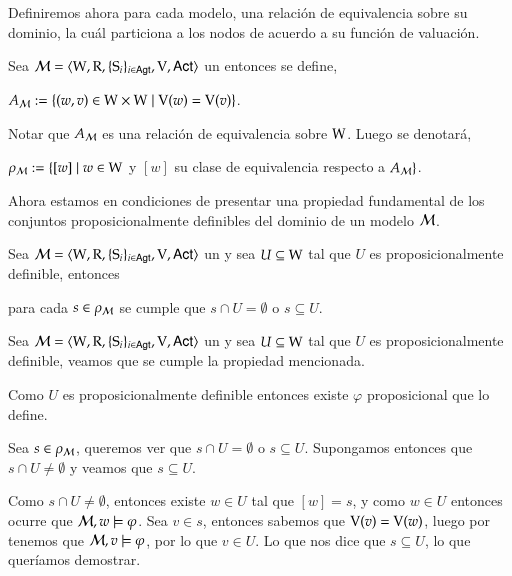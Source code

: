 Definiremos ahora para cada modelo, una relación de equivalencia sobre su dominio, la cuál particiona a los nodos de acuerdo
a su función de valuación.

\begin{definicion}\label{def:Am}
    Sea $\mathcal{M}=\langle \mathrm{W},\mathrm{R},\{ \mathrm{S}_i \}_{i \in {\rm \sf Agt}},\mathrm{V},{\rm \sf Act} \rangle$ un \ults entonces se define, 
    \begin{center}
        $A_{\mathcal{M}} := \{(w,v) \in \mathrm{W} \times \mathrm{W} \mid \mathrm{V}(w) = \mathrm{V}(v)\}$.
    \end{center}
    Notar que $A_{\mathcal{M}}$ es una relación de equivalencia sobre $\mathrm{W}$. Luego se denotará,
    \begin{center}
        $\rho_{\mathcal{M}} := \{ [w] \mid w \in \mathrm{W} $ y $[w]$ su clase de equivalencia respecto a $A_{\mathcal{M}}\}$.
    \end{center}
\end{definicion}

Ahora estamos en condiciones de presentar una propiedad fundamental de los conjuntos proposicionalmente definibles del dominio de un modelo $\mathcal{M}$.

\begin{lema}\label{lema:propositionally-definable-lemma}
    Sea $\mathcal{M}=\langle \mathrm{W},\mathrm{R},\{ \mathrm{S}_i \}_{i \in {\rm \sf Agt}},\mathrm{V},{\rm \sf Act} \rangle$ un \ults y sea $U \subseteq \mathrm{W}$ tal que $U$ es proposicionalmente definible, entonces
    \begin{center}
        para cada $s \in \rho_{\mathcal{M}}$ se cumple que $s \cap U = \emptyset$ o $s \subseteq U$.
    \end{center}
\end{lema}

\begin{demostracion}
    Sea $\mathcal{M}=\langle \mathrm{W},\mathrm{R},\{ \mathrm{S}_i \}_{i \in {\rm \sf Agt}},\mathrm{V},{\rm \sf Act} \rangle$ un \ults y sea $U \subseteq \mathrm{W}$ tal que $U$ es proposicionalmente definible, 
    veamos que se cumple la propiedad mencionada.

    Como $U$ es proposicionalmente definible entonces existe $\varphi$ proposicional que lo define.

    Sea $s \in \rho_{\mathcal{M}}$, queremos ver que $s \cap U = \emptyset$ o $s \subseteq U$. Supongamos entonces que 
    $s \cap U \neq \emptyset$ y veamos que $s \subseteq U$. 
    
    Como $s \cap U \neq \emptyset$, entonces existe $w \in U$ tal que $[w] = s$, y como $w \in U$ entonces ocurre que 
    $\mathcal{M},w \models \varphi$. Sea $v \in s$, entonces sabemos que $\mathrm{V}(v) = \mathrm{V}(w)$, luego por 
     tenemos que $\mathcal{M},v \models \varphi$, por lo que $v \in U$. Lo que nos dice que 
    $s \subseteq U$, lo que queríamos demostrar.  
\end{demostracion}

